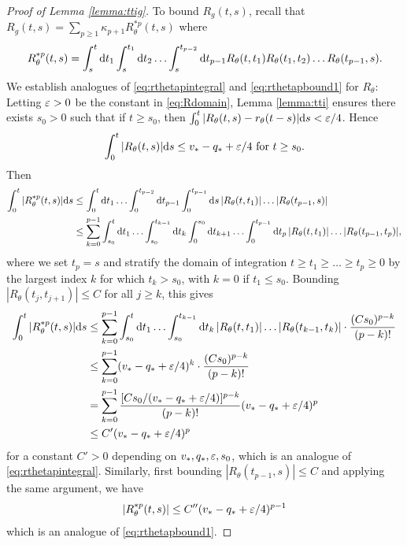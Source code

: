 \begin{proof}[Proof of Lemma \ref{lemma:ttig}]
To bound $R_g(t,s)$, recall that
$R_g(t,s)=\sum_{p \geq 1} \kappa_{p+1}R_\theta^{*p}(t,s)$ where
\[R_\theta^{*p}(t,s)
=\int_s^t \mathrm{d} t_1 \int_s^{t_1} \mathrm{d} t_2 \ldots \int_s^{t_{p-2}} \mathrm{d} t_{p-1}
R_\theta(t,t_1)R_\theta(t_1,t_2)\ldots R_\theta(t_{p-1},s).\]
We establish analogues of \eqref{eq:rthetapintegral} and
\eqref{eq:rthetapbound1} for $R_\theta$:
Letting $\varepsilon>0$ be the constant in \eqref{eq:Rdomain}, Lemma
\ref{lemma:tti} ensures there exists $s_0>0$ such that if $t \geq
s_0$, then $\int_0^t |R_\theta(t,s)-r_\theta(t-s)|\mathrm{d} s<\varepsilon/4$.
Hence
\[\int_0^t |R_\theta(t,s)|\mathrm{d} s \leq v_*-q_*+\varepsilon/4 \text{ for } t \geq s_0.\]
Then
\begin{align*}
\int_0^t |R_\theta^{*p}(t,s)| \mathrm{d} s
&\leq \int_0^t \mathrm{d} t_1
\ldots \int_0^{t_{p-2}}\mathrm{d} t_{p-1}
\int_0^{t_{p-1}}\mathrm{d} s\,
|R_\theta(t,t_1)| \ldots |R_\theta(t_{p-1},s)|\\
&\leq \sum_{k=0}^{p-1} \int_{s_0}^t \mathrm{d} t_1
\ldots \int_{s_0}^{t_{k-1}} \mathrm{d} t_k
\int_0^{s_0} \mathrm{d} t_{k+1} \ldots \int_0^{t_{p-1}}\mathrm{d} t_p\,
|R_\theta(t,t_1)| \ldots |R_\theta(t_{p-1},t_p)|,
\end{align*}
where we set $t_p=s$ and
stratify the domain of integration $t \geq t_1 \geq \ldots \geq t_p \geq 0$ by
the largest index $k$ for which $t_k>s_0$, with $k=0$ if $t_1\leq s_0$.
Bounding $|R_\theta(t_j,t_{j+1})| \leq C$ for all $j \geq k$, this gives
\begin{align}
\int_0^t |R_\theta^{*p}(t,s)|\mathrm{d} s
&\leq \sum_{k=0}^{p-1} \int_{s_0}^t \mathrm{d} t_1
\ldots \int_{s_0}^{t_{k-1}} \mathrm{d} t_k\,|R_\theta(t,t_1)|\ldots
|R_\theta(t_{k-1},t_k)| \cdot \frac{(Cs_0)^{p-k}}{(p-k)!}\notag\\
&\leq \sum_{k=0}^{p-1} (v_*-q_*+\varepsilon/4)^k \cdot \frac{(Cs_0)^{p-k}}{(p-k)!}\notag\\
&=\sum_{k=0}^{p-1} \frac{[Cs_0/(v_*-q_*+\varepsilon/4)]^{p-k}}{(p-k)!}
(v_*-q_*+\varepsilon/4)^p\notag\\
&\leq C'(v_*-q_*+\varepsilon/4)^p\label{eq:Rthetapintegral}
\end{align}
for a constant $C'>0$ depending on $v_*,q_*,\varepsilon,s_0$, which is an analogue of
\eqref{eq:rthetapintegral}.
Similarly, first bounding $|R_\theta(t_{p-1},s)| \leq C$ and applying the same
argument, we have
\begin{equation}\label{eq:Rthetapbound1}
|R_\theta^{*p}(t,s)| \leq C''(v_*-q_*+\varepsilon/4)^{p-1}
\end{equation}
which is an analogue of \eqref{eq:rthetapbound1}.


\end{proof}
